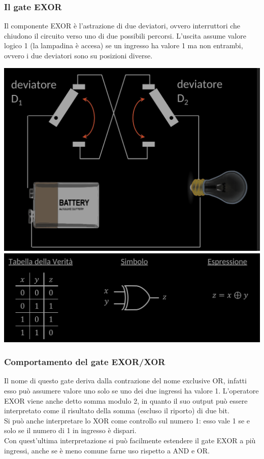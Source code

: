 \documentclass{article}
\begin{document}
\subsubsection{Il gate EXOR}
Il componente EXOR è l’astrazione di due deviatori, ovvero interruttori che chiudono il circuito verso uno di due possibili percorsi. L’uscita assume valore logico 1 (la lampadina è accesa) se un ingresso ha valore 1 ma non entrambi, ovvero i due deviatori sono su posizioni diverse.
\begin{center}
    \includegraphics[scale=0.35]{circEXOR.png}
    \includegraphics[scale=0.35]{desEXOR.png}
\end{center}
\subsubsection{Comportamento del gate EXOR/XOR}
Il nome di questo gate deriva dalla contrazione del nome exclusive OR, infatti esso può assumere valore uno solo se uno dei due ingressi ha valore 1. L’operatore EXOR viene anche detto somma modulo 2, in quanto il suo output può essere interpretato come il risultato della somma (escluso il riporto) di due bit. \\
Si può anche interpretare lo XOR come controllo sul numero 1: esso vale 1 se e solo se il numero di 1 in ingresso è dispari.\\
Con quest’ultima interpretazione si può facilmente estendere il gate EXOR a più ingressi, anche se è meno comune farne uso rispetto a AND e OR.
\end{document}
